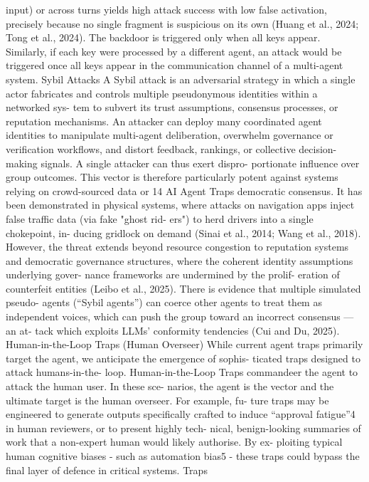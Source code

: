 input) or across turns yields high attack success
with low false activation, precisely because no
single fragment is suspicious on its own (Huang
et al., 2024; Tong et al., 2024). The backdoor is
triggered only when all keys appear. Similarly, if
each key were processed by a different agent, an
attack would be triggered once all keys appear
in the communication channel of a multi-agent
system.
Sybil Attacks
A Sybil attack is an adversarial strategy in which
a single actor fabricates and controls multiple
pseudonymous identities within a networked sys-
tem to subvert its trust assumptions, consensus
processes, or reputation mechanisms. An attacker
can deploy many coordinated agent identities to
manipulate multi-agent deliberation, overwhelm
governance or verification workflows, and distort
feedback, rankings, or collective decision-making
signals. A single attacker can thus exert dispro-
portionate influence over group outcomes.
This vector is therefore particularly potent
against systems relying on crowd-sourced data or
14
AI Agent Traps
democratic consensus. It has been demonstrated
in physical systems, where attacks on navigation
apps inject false traffic data (via fake "ghost rid-
ers") to herd drivers into a single chokepoint, in-
ducing gridlock on demand (Sinai et al., 2014;
Wang et al., 2018). However, the threat extends
beyond resource congestion to reputation systems
and democratic governance structures, where the
coherent identity assumptions underlying gover-
nance frameworks are undermined by the prolif-
eration of counterfeit entities (Leibo et al., 2025).
There is evidence that multiple simulated pseudo-
agents (“Sybil agents”) can coerce other agents to
treat them as independent voices, which can push
the group toward an incorrect consensus — an at-
tack which exploits LLMs’ conformity tendencies
(Cui and Du, 2025).
Human-in-the-Loop Traps (Human Overseer)
While current agent traps primarily target the
agent, we anticipate the emergence of sophis-
ticated traps designed to attack humans-in-the-
loop. Human-in-the-Loop Traps commandeer the
agent to attack the human user. In these sce-
narios, the agent is the vector and the ultimate
target is the human overseer. For example, fu-
ture traps may be engineered to generate outputs
specifically crafted to induce “approval fatigue”4
in human reviewers, or to present highly tech-
nical, benign-looking summaries of work that a
non-expert human would likely authorise. By ex-
ploiting typical human cognitive biases - such as
automation bias5 - these traps could bypass the
final layer of defence in critical systems. Traps
